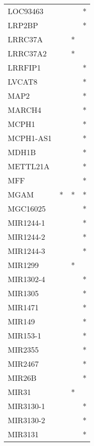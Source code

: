 \begin{longtable}{lccc}
LOC93463       &           &     &       * \\
LRP2BP         &           &     &       * \\
LRRC37A        &           &   * &         \\
LRRC37A2       &           &   * &         \\
LRRFIP1        &           &     &       * \\
LVCAT8         &           &     &       * \\
MAP2           &           &     &       * \\
MARCH4         &           &     &       * \\
MCPH1          &           &     &       * \\
MCPH1-AS1      &           &     &       * \\
MDH1B          &           &     &       * \\
METTL21A       &           &     &       * \\
MFF            &           &     &       * \\
MGAM           &         * &   * &       * \\
MGC16025       &           &     &       * \\
MIR1244-1      &           &     &       * \\
MIR1244-2      &           &     &       * \\
MIR1244-3      &           &     &       * \\
MIR1299        &           &   * &         \\
MIR1302-4      &           &     &       * \\
MIR1305        &           &     &       * \\
MIR1471        &           &     &       * \\
MIR149         &           &     &       * \\
MIR153-1       &           &     &       * \\
MIR2355        &           &     &       * \\
MIR2467        &           &     &       * \\
MIR26B         &           &     &       * \\
MIR31          &           &   * &         \\
MIR3130-1      &           &     &       * \\
MIR3130-2      &           &     &       * \\
MIR3131        &           &     &       * \\

\end{longtable}
